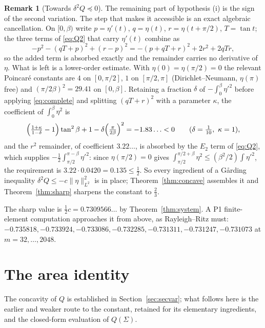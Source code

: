 \documentclass[11pt]{article}
\theoremstyle{definition}
\newtheorem{remark}[theorem]{Remark}
\newcommand{\Sig}{\Sigma}
\begin{document}
\begin{remark}[Towards $\delta^2Q\preceq0$]\label{rem:garding}
The remaining part of hypothesis (i) is the sign of the second variation. The step that
makes it accessible is an exact algebraic cancellation. On $[0,\beta)$ write
$p=\eta'(t)$, $q=\eta(t)$, $r=\eta(t+\pi/2)$, $T=\tan t$; the three terms of
\eqref{eq:Q2} that carry $\eta'(t)$ combine as
\begin{equation}\label{eq:complete}
  -p^2-(qT+p)^2+(r-p)^2=-(p+qT+r)^2+2r^2+2qTr ,
\end{equation}
so the added term is absorbed exactly and the remainder carries no derivative of $\eta$.
What is left is a lower-order estimate. With $\eta(0)=\eta(\pi/2)=0$ the relevant
Poincaré constants are $4$ on $[0,\pi/2]$, $1$ on $[\pi/2,\pi]$ (Dirichlet--Neumann,
$\eta(\pi)$ free) and $(\pi/2\beta)^2=29.41$ on $[0,\beta]$. Retaining a fraction
$\delta$ of $-\int_0^\beta\eta'^2$ before applying \eqref{eq:complete} and splitting
$(qT+r)^2$ with a parameter $\kappa$, the coefficient of $\int_0^\beta\eta^2$ is
\[
  \Bigl(\tfrac{1+\kappa}{1-\delta}-1\Bigr)\tan^2\beta+1-\delta\Bigl(\tfrac{\pi}{2\beta}\Bigr)^2
  =-1.83\ldots<0 \qquad(\delta=\tfrac1{10},\ \kappa=1),
\]
and the $r^2$ remainder, of coefficient $3.22\ldots$, is absorbed by the $E_2$ term of
\eqref{eq:Q2}, which supplies $-\tfrac12\int_{\pi/2}^{\pi-\beta}\eta'^2$: since
$\eta(\pi/2)=0$ gives
$\int_{\pi/2}^{\pi/2+\beta}\eta^2\le(\beta^2/2)\int\eta'^2$, the requirement is
$3.22\cdot0.0420=0.135\le\tfrac12$. So every ingredient of a Gårding inequality
$\delta^2Q\le-c\|\eta\|_{L^2}^2$ is in place; Theorem~\ref{thm:concave} assembles it and
Theorem~\ref{thm:sharp} sharpens the constant to $\tfrac23$.

The sharp value is $\tfrac12 c=0.7309566\ldots$ by Theorem~\ref{thm:system}. A P1
finite-element computation approaches it from above, as Rayleigh--Ritz must:
$-0.735818,-0.733924,-0.733086,-0.732285,-0.731311,-0.731247,-0.731073$ at
$m=32,\ldots,2048$.
\end{remark}

\section{The area identity}\label{sec:final}

The concavity of $Q$ is established in Section~\ref{sec:secvar}; what follows here is the
earlier and weaker route to the constant, retained for its elementary ingredients, and the
closed-form evaluation of $Q(\Sig)$.
\end{document}
